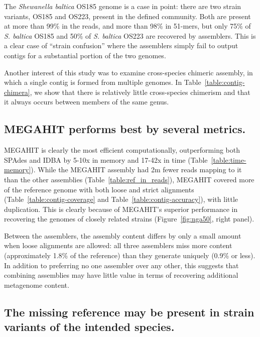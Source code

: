 \documentclass[11pt]{article}
\begin{document}
The {\em Shewanella baltica} OS185 genome is a case in point: there
are two strain variants, OS185 and OS223, present in the defined
community.  Both are present at more than 99\% in the reads, and more
than 98\% in 51-mers, but only 75\% of {\em S. baltica} OS185 and 50\%
of {\em S. baltica} OS223 are recovered by assemblers.  This is a
clear case of ``strain confusion'' where the assemblers simply fail to
output contigs for a substantial portion of the two genomes.

Another interest of this study was to examine cross-species chimeric
assembly, in which a single contig is formed from multiple genomes.
In Table~\ref{table:contig-chimera}, we show that there is relatively
little cross-species chimerism and that it always occurs between
members of the same genus.

\subsection*{MEGAHIT performs best by several metrics.}

MEGAHIT is clearly the most efficient computationally, outperforming
both SPAdes and IDBA by 5-10x in memory and 17-42x in time
(Table~\ref{table:time-memory}).  While the MEGAHIT assembly had 2m
fewer reads mapping to it than the other assemblies
(Table~\ref{table:ref_in_reads}), MEGAHIT covered more of the
reference genome with both loose and strict alignments
(Table~\ref{table:contig-coverage} and
Table~\ref{table:contig-accuracy}), with little duplication.  This is
clearly because of MEGAHIT's superior performance in recovering the
genomes of closely related strains (Figure~\ref{fig:nga50}, right
panel).



Between the assemblers, the assembly content differs by only a small
amount when loose alignments are allowed: all three assemblers miss
more content (approximately 1.8\% of the reference) than they generate
uniquely (0.9\% or less).  In addition to preferring no one assembler
over any other, this suggests that combining assemblies may have
little value in terms of recovering additional metagenome content.


\subsection*{The missing reference may be present in strain variants of the intended species.}
\end{document}

